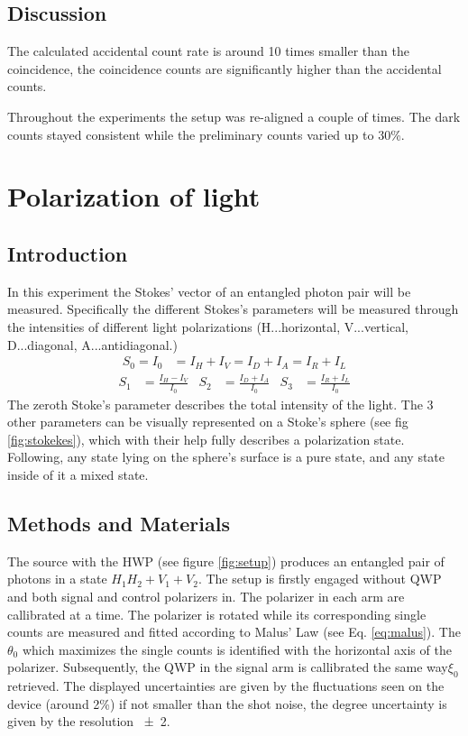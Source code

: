 \documentclass[12pt,a4paper]{article} %
\begin{document}
\subsection{Discussion}
The calculated accidental count rate is around 10 times smaller than the coincidence, the coincidence counts are significantly higher than the accidental counts.

Throughout the experiments the setup was re-aligned a couple of times. The dark counts stayed consistent while the preliminary counts varied up to 30\%. 


\section{Polarization of light}
\subsection{Introduction}
In this experiment the Stokes' vector of an entangled photon pair will be measured. Specifically the different Stokes's parameters will be measured through the intensities of different light polarizations (H...horizontal, V...vertical, D...diagonal, A...antidiagonal.)
\begin{align}
        S_0 = I_0 &= I_H + I_V = I_D + I_A = I_R + I_L
        \label{eq:stokesparams}
\end{align}
\begin{align}
    S_1 &= \frac{I_H - I_V}{I_0} & S_2 &= \frac{I_D + I_A}{I_0} & S_3 &= \frac{I_R + I_L}{I_0}
    \label{eq:stokesparams}
\end{align}
The zeroth Stoke's parameter describes the total intensity of the light. The 3 other parameters can be visually represented on a Stoke's sphere (see fig \ref{fig:stokekes}), which with their help fully describes a polarization state. Following, any state lying on the sphere's surface is a pure state, and any state inside of it a mixed state.


\subsection{Methods and Materials}
The source with the HWP (see figure \ref{fig:setup}) produces an entangled pair of photons in a state $H_1 H_2 + V_1 + V_2$. The setup is firstly engaged without QWP and both signal and control polarizers in. The polarizer in each arm are callibrated at a time. The polarizer is rotated while its corresponding single counts are measured and fitted according to Malus' Law (see Eq. \ref{eq:malus}). The $\theta_0$ which maximizes the single counts is identified with the horizontal axis of the polarizer. Subsequently, the QWP in the signal arm is callibrated the same way$\xi_0$ retrieved. The displayed uncertainties are given by the fluctuations seen on the device (around 2\%) if not smaller than the shot noise, the degree uncertainty is given by the resolution \qty{\pm2}{\deg}.
\end{document}
